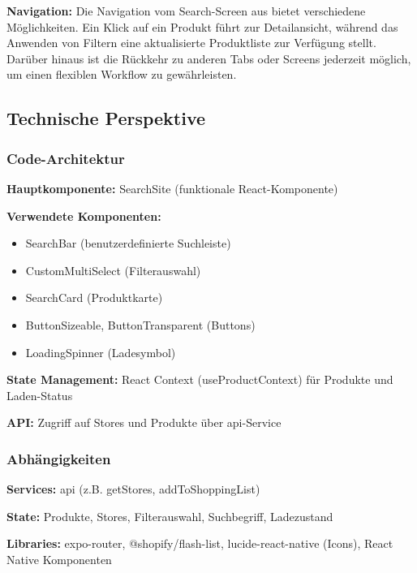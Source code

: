 \documentclass[12pt, a4paper]{report} %
\begin{document}
\noindent\textbf{Navigation:}
Die Navigation vom Search-Screen aus bietet verschiedene Möglichkeiten. Ein Klick auf ein Produkt führt zur Detailansicht, während das Anwenden von Filtern eine aktualisierte Produktliste zur Verfügung stellt. Darüber hinaus ist die Rückkehr zu anderen Tabs oder Screens jederzeit möglich, um einen flexiblen Workflow zu gewährleisten.

\subsection{Technische Perspektive}

\subsubsection{Code-Architektur}

\textbf{Hauptkomponente:} SearchSite (funktionale React-Komponente)

\noindent\textbf{Verwendete Komponenten:}
\begin{itemize}
    \item SearchBar (benutzerdefinierte Suchleiste)
    \item CustomMultiSelect (Filterauswahl)
    \item SearchCard (Produktkarte)
    \item ButtonSizeable, ButtonTransparent (Buttons)
    \item LoadingSpinner (Ladesymbol)
\end{itemize}

\noindent\textbf{State Management:} React Context (useProductContext) für Produkte und Laden-Status

\noindent\textbf{API:} Zugriff auf Stores und Produkte über api-Service

\subsubsection{Abhängigkeiten}

\textbf{Services:} api (z.B. getStores, addToShoppingList)

\noindent\textbf{State:} Produkte, Stores, Filterauswahl, Suchbegriff, Ladezustand

\noindent\textbf{Libraries:} expo-router, @shopify/flash-list, lucide-react-native (Icons), React Native Komponenten
\end{document}
